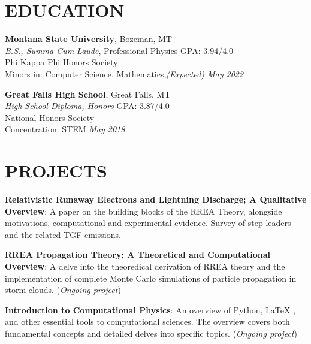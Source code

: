 \documentclass[margin]{res}
\begin{document}
\begin{resume}

\section{EDUCATION}
\raggedright
\textbf{Montana State University}, Bozeman, MT\\\vspace{0.5ex}
{\sl B.S., Summa Cum Laude}, Professional Physics \hfill GPA: 3.94/4.0\\
Phi Kappa Phi Honors Society\\
Minors in: Computer Science, Mathematics,\hfill {\sl (Expected) May 2022}

\raggedright
\textbf{Great Falls High School}, Great Falls, MT\\\vspace{0.5ex}
{\sl High School Diploma, Honors} \hfill GPA: 3.87/4.0\\
National Honors Society\\
Concentration: STEM \hfill {\sl May 2018}\\


\section{PROJECTS}
\raggedright
\par
\textbf{Relativistic Runaway Electrons and Lightning Discharge; A Qualitative Overview}: 
A paper on the building blocks of the RREA Theory, alongside motivations, computational and experimental evidence. Survey of step leaders and the related TGF emissions.
\par
\textbf{RREA Propagation Theory; A Theoretical and Computational Overview}:
A delve into the theoredical derivation of RREA theory and the implementation of complete Monte Carlo simulations of particle propagation in storm-clouds. ({\sl Ongoing project})
\par 
\textbf{Introduction to Computational Physics}:
An overview of Python, LaTeX , and other essential tools to computational sciences. The overview covers both fundamental concepts and detailed delves into specific topics. ({\sl Ongoing project})


\end{resume}
\end{document}
